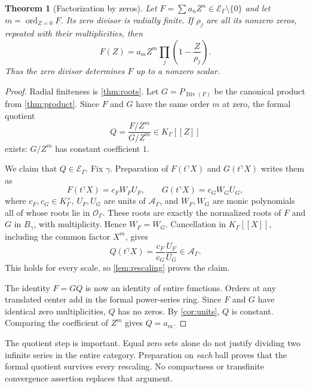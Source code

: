 \documentclass[11pt]{article}
\newtheorem{theorem}{Theorem}[section]
\theoremstyle{plain}
\theoremstyle{plain}
\theoremstyle{plain}
\theoremstyle{definition}
\theoremstyle{definition}
\theoremstyle{definition}
\theoremstyle{remark}
\newcommand{\K}{K_\Gamma}\newcommand{\E}{\mathcal E_\Gamma}
\newcommand{\A}{\mathcal A_\Gamma}\newcommand{\OO}{\mathcal O_\Gamma}
\DeclareMathOperator{\ord}{ord}\DeclareMathOperator{\cf}{cf}
\DeclareMathOperator{\Div}{Div}\DeclareMathOperator{\inpol}{in}
\begin{document}
\begin{theorem}[Factorization by zeros]\label{thm:factorization}
Let $F=\sum a_nZ^n\in\E\setminus\{0\}$ and let
$m=\ord_{Z=0}F$. Its zero divisor is radially finite. If $\rho_j$ are
all its nonzero zeros, repeated with their multiplicities, then
\begin{equation}\label{eq:factorization}
 F(Z)=a_mZ^m\prod_j\left(1-\frac Z{\rho_j}\right).
\end{equation}
Thus the zero divisor determines $F$ up to a nonzero scalar.
\end{theorem}
\begin{proof}
Radial finiteness is \cref{thm:roots}. Let $G=P_{\Div(F)}$ be the
canonical product from \cref{thm:product}. Since $F$ and $G$ have the
same order $m$ at zero, the formal quotient
\[
 Q=\frac{F/Z^m}{G/Z^m}\in\K[[Z]]
\]
exists: $G/Z^m$ has constant coefficient $1$.

We claim that $Q\in\E$. Fix $\gamma$. Preparation of $F(t^\gamma X)$
and $G(t^\gamma X)$ writes them as
\[
 F(t^\gamma X)=c_F W_F U_F,\qquad
 G(t^\gamma X)=c_G W_G U_G,
\]
where $c_F,c_G\in\K^\times$, $U_F,U_G$ are units of $\A$, and
$W_F,W_G$ are monic polynomials all of whose roots lie in $\OO$.
These roots are exactly the normalized roots of $F$ and $G$ in
$B_\gamma$, with multiplicity. Hence $W_F=W_G$. Cancellation in
$\K[[X]]$, including the common factor $X^m$, gives
\[
 Q(t^\gamma X)=\frac{c_F}{c_G}\frac{U_F}{U_G}\in\A.
\]
This holds for every scale, so \cref{lem:rescaling} proves the claim.

The identity $F=GQ$ is now an identity of entire functions.
Orders at any translated center add in the formal power-series ring.
Since $F$ and $G$ have identical zero multiplicities, $Q$ has no zeros.
By \cref{cor:units}, $Q$ is constant. Comparing the coefficient of
$Z^m$ gives $Q=a_m$.
\end{proof}

The quotient step is important. Equal zero sets alone do not justify
dividing two infinite series in the entire category. Preparation on
\emph{each} ball proves that the formal quotient survives every
rescaling. No compactness or transfinite convergence assertion replaces
that argument.
\end{document}
